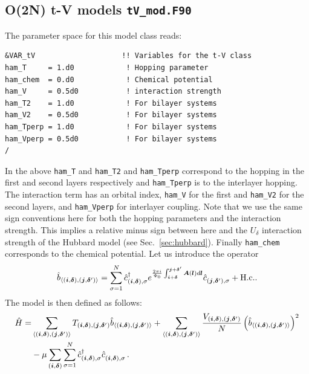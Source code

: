 \subsection{O(2N)  t-V models  \texttt{tV\_mod.F90}}


The parameter space for this model class  reads: 

\begin{lstlisting}[style=fortran,escapechar=\#,breaklines=true]
&VAR_tV                    !! Variables for the t-V class
ham_T     = 1.d0            ! Hopping parameter
ham_chem  = 0.d0            ! Chemical potential
ham_V     = 0.5d0           ! interaction strength
ham_T2    = 1.d0            ! For bilayer systems
ham_V2    = 0.5d0           ! For bilayer systems
ham_Tperp = 1.d0            ! For bilayer systems
ham_Vperp = 0.5d0           ! For bilayer systems
/

\end{lstlisting}
In the above   \texttt{ham\_T} and \texttt{ham\_T2} and \texttt{ham\_Tperp}   correspond to the hopping in the first and second layers respectively and  \texttt{ham\_Tperp}   is to the interlayer hopping.   The interaction term has an orbital index, 
\texttt{ham\_V}  for the first and  \texttt{ham\_V2}  for the second layers,  and \texttt{ham\_Vperp} for interlayer coupling. Note that we use the same sign conventions here for both the hopping parameters and the interaction strength. This implies a relative minus sign between here and the $U_\delta$ interaction strength of the Hubbard model (see Sec.~\ref{sec:hubbard}).
Finally   \texttt{ham\_chem}  corresponds to the chemical potential. Let us introduce the operator
\begin{equation}
\hat{b}_{\langle (\boldsymbol{i},\boldsymbol{\delta}), (\boldsymbol{j},\boldsymbol{\delta}') \rangle} =  \sum_{\sigma =1}^{N}    \hat{c}^{\dagger}_{(\boldsymbol{i},\boldsymbol{\delta}), \sigma }   e^{\frac{2 \pi i}{\Phi_0} \int_{\boldsymbol{i} + \boldsymbol{\delta}}^{\boldsymbol{j} + \boldsymbol{\delta}'}  
	\boldsymbol{A}(\boldsymbol{l})  d \boldsymbol{l}} \hat{c}^{}_{(\boldsymbol{j},\boldsymbol{\delta}'),\sigma} 
+ \textrm{H.c.}.
\end{equation}
The model is then defined as follows:
\begin{align}
\hat{H}= & \sum_{\langle (\ve{i},\ve{\delta}), (\ve{j},\ve{\delta}') \rangle}   T_{(\ve{i},\ve{\delta}), (\ve{j},\ve{\delta}')}    \hat{b}_{\langle (\ve{i},\ve{\delta}), (\ve{j},\ve{\delta}') \rangle}
+ \sum_{\langle (\ve{i},\ve{\delta}), (\ve{j},\ve{\delta}') \rangle}  \frac{V_{(\ve{i},\ve{\delta}), (\ve{j},\ve{\delta}')}}{N} \left(  \hat{b}_{\langle (\ve{i},\ve{\delta}), (\ve{j},\ve{\delta}') \rangle}  \right)^2  \nonumber \\
& - \mu \sum_{(\ve{i},\ve{\delta})}  \sum_{\sigma =1}^{N} \hat{c}^{\dagger}_{(\vec{i},\ve{\delta}),\sigma } \hat{c}^{\phantom\dagger}_{(\vec{i},\ve{\delta}),\sigma } \,.
\end{align}
